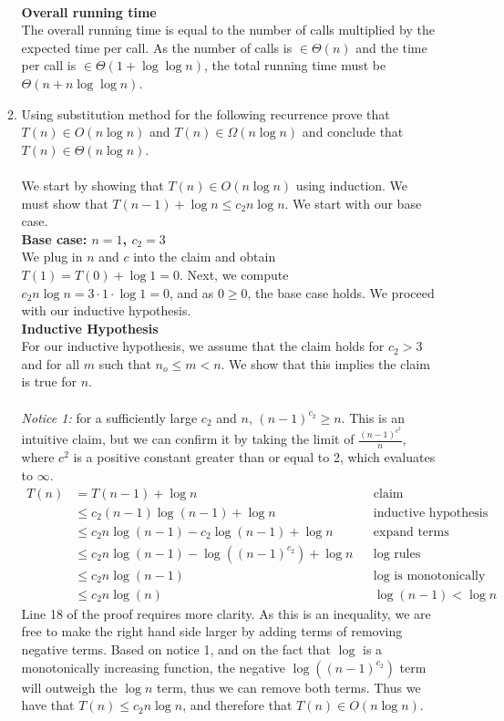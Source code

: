 \documentclass{article}
\begin{document}
\begin{enumerate}
\begin{enumerate}
\\ \textbf{Overall running time}
\\ The overall running time is equal to the number of calls multiplied by the expected time per call. As the number of calls is $\in \Theta(n)$ and the time per call is $\in \Theta(1+\log \log n)$, the total running time must be $\Theta(n+n\log \log n)$.
	\item Using substitution method for the following recurrence prove that $T(n)\in O(n \log n)$ and $T(n) \in \Omega(n \log n)$ and conclude that $T(n)\in \Theta(n \log n)$.
	\\\\ We start by showing that $T(n)\in O(n \log n)$ using induction. We must show that $T(n-1)+\log n \leq c_2 n \log n$. We start with our base case.
	\\ \textbf{Base case: $n=1$, $c_2=3$}
	\\ We plug in $n$ and $c$ into the claim and obtain $T(1)=T(0)+\log 1= 0$. Next, we compute $c_2 n \log n = 3 \cdot 1 \cdot \log 1 = 0$, and as $0 \geq 0$, the base case holds. We proceed with our inductive hypothesis.
	\\ \textbf{Inductive Hypothesis}
	\\ For our inductive hypothesis, we assume that the claim holds for $c_2>3$ and for all $m$ such that $n_o \leq m < n$. We show that this implies the claim is true for $n$.
	\\\\ \emph{Notice 1:} for a sufficiently large $c_2$ and $n$, $(n-1)^{c_2}\geq n$. This is an intuitive claim, but we can confirm it by taking the limit of $\frac{(n-1)^{c^2}}{n}$, where $c^2$ is a positive constant greater than or equal to 2, which evaluates to $\infty$. 
	\begin{align}
	T(n) &= T(n-1)+\log n && \text{claim} \\
	& \leq c_2(n-1)\log (n-1)+\log n && \text{inductive hypothesis} \\
	&\leq c_2n\log(n-1)-c_2 \log (n-1) + \log n && \text{expand terms} \\
	&\leq c_2n\log(n-1)-\log((n-1)^{c_2})+\log n && \text{log rules} \\
	&\leq c_2n\log(n-1) && \text{$\log$ is monotonically increasing, notice 1} \\
	&\leq c_2n\log(n) && \text{$\log(n-1) < \log n$}
	\end{align}
Line 18 of the proof requires more clarity. As this is an inequality, we are free to make the right hand side larger by adding terms of removing negative terms. Based on notice 1, and on the fact that $\log$ is a monotonically increasing function, the negative $\log((n-1)^{c_2})$ term will outweigh the $\log n$ term, thus we can remove both terms. Thus we have that $T(n) \leq c_2n\log n$, and therefore that $T(n) \in O(n\log n)$. 

\end{enumerate}
\end{enumerate}
\end{document}
